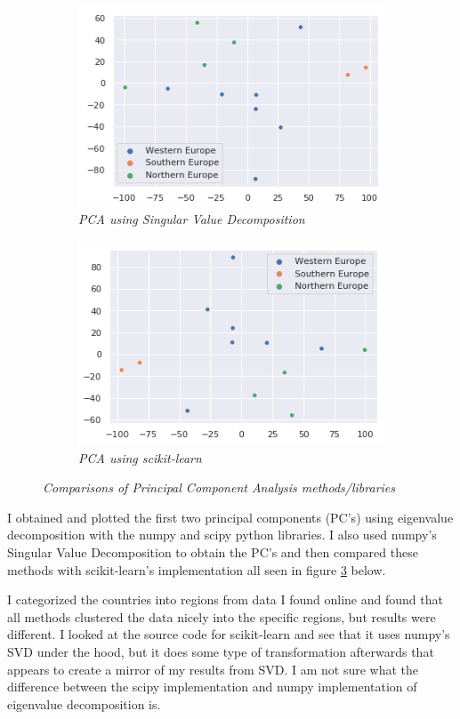 \documentclass[a4paper]{article}
\begin{document}
\begin{figure}[h]
\begin{subfigure}[b]{0.5\textwidth}
    	\centering
        \includegraphics[width=\textwidth]{pca_svd.png}
        \caption{\it PCA using Singular Value Decomposition}
        \label{fig:pca_svd}
    \end{subfigure}
    \begin{subfigure}[b]{0.5\textwidth}
    	\centering
        \includegraphics[width=\textwidth]{pca_sk.png}
        \caption{\it PCA using scikit-learn}
        \label{fig:pca_sk}
    \end{subfigure}
    \caption{\it Comparisons of Principal Component Analysis methods/libraries}\label{fig3}
\end{figure}

I obtained and plotted the first two principal components (PC's) using eigenvalue decomposition with the numpy and scipy python libraries.  I also used numpy's Singular Value Decomposition to obtain the PC's and then compared these methods with scikit-learn's implementation all seen in figure \ref{fig3} below.

I categorized the countries into regions from data I found online and found that all methods clustered the data nicely into the specific regions, but results were different.  I looked at the source code for scikit-learn and see that it uses numpy's SVD under the hood, but it does some type of transformation afterwards that appears to create a mirror of my results from SVD.  I am not sure what the difference between the scipy implementation and numpy implementation of eigenvalue decomposition is.



\end{document}
